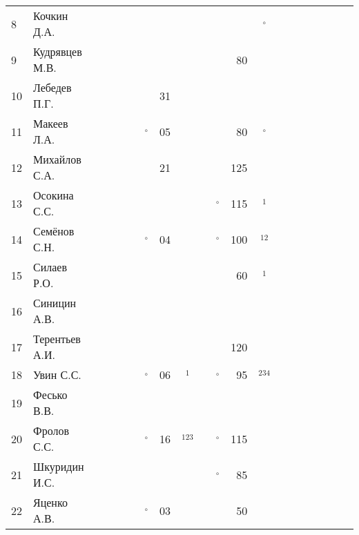 \documentclass[a4paper,11pt]{article}
\newcommand*\OK{&\small \ding{51}$\!\!_\circ$} %
\newcommand*\Ok{&\small \ding{51}$\!\!_\circ$} %
\newcommand*\ok{&{\small \ding{51}}} %
\newcommand*\no{&{\small }} %
\newcommand*\da{&{\small\ding{48}$\!\!_1$}} %
\newcommand*\ab{&{\small\ding{48}$\!\!_{12}$}} %
\newcommand*\dabc{&{\small\ding{48}$\!\!_{123}$}} %
\newcommand*\bd{&{\small\ding{48}$\!\!_{234}$}} %
\begin{document}
\begin{tabular}{l|l|cccccccccrcccccccc}
 8&Кочкин Д.А.     \no\no\no\no\ok\ok\no  \ok\no \no\Ok&&&&&&&\\
 9&Кудрявцев М.В.  \no\no\ok\ok\no\no\no  \ok\ok& 80\ok&&&&&&&\\
10&Лебедев П.Г.    \ok\ok\no\ok\ok&31\no  \ok\no \no\no&&&&&&&\\
11&Макеев Л.А.     \ok\ok\ok\ok\OK&05\ok  \ok\ok& 80\Ok&&&&&&&\\
12&Михайлов С.А.   \no\no\ok\ok\ok&21\no  \ok\ok&125\ok&&&&&&&\\
13&Осокина С.С.    \ok\ok\ok\ok\no\no\ok  \ok\OK&115\da&&&&&&&\\
14&Семёнов С.Н.    \ok\ok\ok\ok\OK&04\ok  \ok\OK&100\ab&&&&&&&\\
15&Силаев Р.О.     \ok\ok\no\no\no\no\no  \no\ok& 60\da&&&&&&&\\
16&Синицин А.В.    \ok\ok\no\ok\no\no\no  \no\no \no\no&&&&&&&\\
17&Терентьев А.И.  \ok\ok\ok\ok\no\no\no  \no\ok&120\no&&&&&&&\\
18&Увин С.С.       \ok\ok\ok\ok\OK&06\da  \ok\OK& 95\bd&&&&&&&\\
19&Фесько В.В.     \no\no\no\no\no\no\no  \no\no \no\no&&&&&&&\\
20&Фролов С.С.     \ok\ok\ok\ok\OK&16\dabc\ok\OK&115\ok&&&&&&&\\ 
21&Шкуридин И.С.   \ok\ok\ok\ok\ok\no\ok  \ok\OK& 85\ok&&&&&&&\\
22&Яценко А.В.     \ok\ok\ok\ok\OK&03\ok  \ok\ok& 50\ok&&&&&&&\\ 
\bottomrule
\end{tabular} 
\newpage
\end{document}
